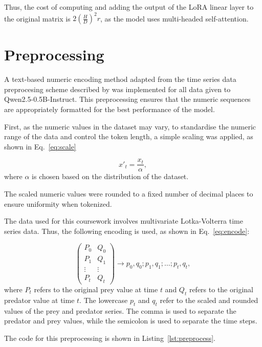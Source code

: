 \documentclass[11pt,a4paper]{article}
\begin{document}
Thus, the cost of computing and adding the output of the LoRA linear layer to the original matrix is $2(\frac{H}{D})^2r$, as the model uses multi-headed self-attention.

\section{Preprocessing}
\label{zero}
A text-based numeric encoding method adapted from the time series data preprocesing scheme described by \citeauthor{gruver2024largelanguagemodelszeroshot} was implemented for all data given to Qwen2.5-0.5B-Instruct. This preprocessing ensures that the numeric sequences are appropriately formatted for the best performance of the model.

First, as the numeric values in the dataset may vary, to standardise the numeric range of the data and control the token length, a simple scaling was applied, as shown in Eq.~\ref{eq:scale}

\begin{equation}
    x'_t = \frac{x_t}{\alpha},
    \label{eq:scale}
\end{equation}
where $\alpha$ is chosen based on the distribution of the dataset.

The scaled numeric values were rounded to a fixed number of decimal places to ensure uniformity when tokenized.

The data used for this coursework involves multivariate Lotka-Volterra time series data. Thus, the following encoding is used, as shown in Eq.~\ref{eq:encode}:

\begin{equation}
    \begin{pmatrix}
        P_0 & Q_0 \\
        P_1 & Q_1 \\
        \vdots & \vdots \\
        P_t & Q_t 
        \end{pmatrix}  
        \rightarrow p_0,q_0;p_{1},q_{1};\ldots;p_{t},q_{t},
    \label{eq:encode}
\end{equation}
where $P_t$ refers to the original prey value at time $t$ and $Q_t$ refers to the original predator value at time $t$. The lowercase $p_t$ and $q_t$ refer to the scaled and rounded values of the prey and predator series. The comma is used to separate the predator and prey values, while the semicolon is used to separate the time steps.

The code for this preprocessing is shown in Listing~\ref{lst:preprocess}.
\end{document}
